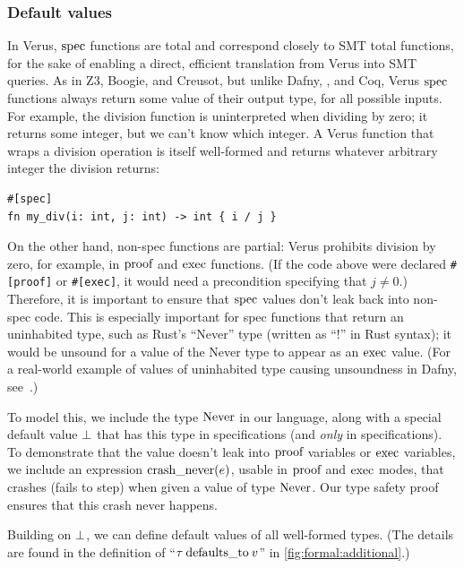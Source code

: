 \ifextended
\subsubsection{Default values} \label{sec:default}

In Verus, $\textrm{spec}$ functions are total and correspond closely to SMT total functions,
for the sake of enabling a direct, efficient translation from Verus into SMT queries.
As in Z3, Boogie, and Creusot,
but unlike Dafny, \fstar, and Coq,
Verus $\textrm{spec}$ functions always return some value of their output type, for all possible inputs.
For example, the division function is uninterpreted when dividing by zero;
it returns some integer, but we can't know which integer.
A Verus function that wraps a division operation is itself well-formed
and returns whatever arbitrary integer the division returns:

\begin{lstlisting}[language=Verus]
#[spec]
fn my_div(i: int, j: int) -> int { i / j }
\end{lstlisting}

On the other hand, non-spec functions are partial:
Verus prohibits division by zero, for example, in $\textrm{proof}$ and $\textrm{exec}$ functions.
(If the code above were declared \verb`#[proof]` or \verb`#[exec]`,
it would need a precondition specifying that $j \neq 0$.)
Therefore, it is important to ensure that $\textrm{spec}$ values don't leak back into non-spec code.
This is especially important for spec functions that return an uninhabited type,
such as Rust's ``Never'' type (written as ``!'' in Rust syntax);
it would be unsound for a value of the Never type to appear as an $\textrm{exec}$ value.
(For a real-world example of values of uninhabited type causing unsoundness in Dafny,
see~\cite{dafny:unsoundness}.)

To model this, we include the type $\textrm{Never}$ in our language,
along with a special default value $\bot$ that has this type in specifications
(and {\it only} in specifications).
To demonstrate that the value doesn't leak into $\textrm{proof}$ variables or $\textrm{exec}$ variables,
we include an expression $\textrm{crash\_never}(e)$, usable in $\textrm{proof}$ and $\textrm{exec}$ modes,
that crashes (fails to step) when given a value of type $\textrm{Never}$.
Our type safety proof ensures that this crash never happens.

Building on $\bot$, we can define default values of all well-formed types.
(The details are found in the definition of ``$\tau\: \textrm{defaults\_to}\: v$'' in \autoref{fig:formal:additional}.)
\fi

